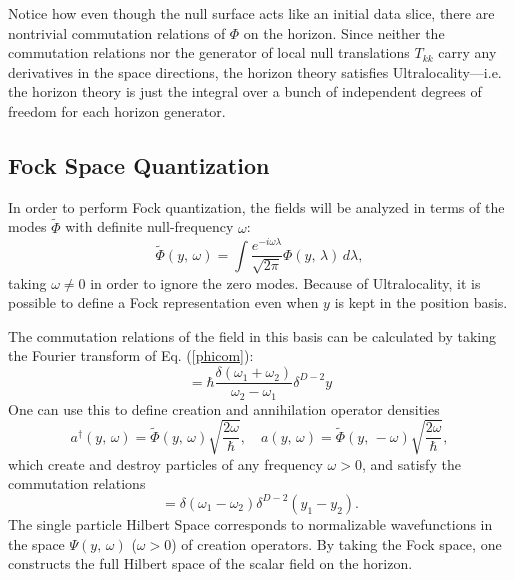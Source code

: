 \documentclass{article}
\begin{document}
Notice how even though the null surface acts like an initial data slice, there are nontrivial commutation relations of $\Phi$ on the horizon.  Since neither the commutation relations nor the generator of local null translations $T_{kk}$ carry any derivatives in the space directions, the horizon theory satisfies Ultralocality---i.e. the horizon theory is just the integral over a bunch of independent degrees of freedom for each horizon generator.

\subsection{Fock Space Quantization}\label{fock}

In order to perform Fock quantization, the fields will be analyzed in terms of the modes $\tilde{\Phi}$ with definite null-frequency $\omega$:
\begin{equation}
\tilde{\Phi}(y,\,\omega) = \int
\frac{e^{-i\omega \lambda}}{\sqrt{2\pi}} \Phi(y,\,\lambda)\,d\lambda,
\end{equation}
taking $\omega \ne 0$ in order to ignore the zero modes.  Because of Ultralocality, it is possible to define a Fock representation even when $y$ is kept in the position basis.

The commutation relations of the field in this basis can be calculated by taking the Fourier transform of Eq. (\ref{phicom}):
\begin{equation}
[\tilde{\Phi}(y_1,\,\omega_1),\,\tilde{\Phi}(y_2,\,\omega_2)] =
\hbar \frac{\delta(\omega_1 + \omega_2)}{\omega_2 - \omega_1} \delta^{D-2}y
\end{equation}
One can use this to define creation and annihilation operator densities
\begin{equation}
a^{\dagger}(y,\,\omega) = \tilde{\Phi}(y,\,\omega) \sqrt{\frac{2\omega}{\hbar}}, \quad
a(y,\,\omega) = \tilde{\Phi}(y,\,-\omega) \sqrt{\frac{2\omega}{\hbar}},
\end{equation}
which create and destroy particles of any frequency $\omega > 0$, and satisfy the commutation relations
\begin{equation}
[a(y_1,\,\omega_1),\,a^\dagger(y_2,\,\omega_2)] =
\delta(\omega_1 - \omega_2) \delta^{D-2}(y_1 - y_2).
\end{equation}
The single particle Hilbert Space corresponds to normalizable wavefunctions in the space $\Psi(y,\,\omega)$ ($\omega > 0$) of creation operators.  By taking the Fock space, one constructs the full Hilbert space of the scalar field on the horizon.
\end{document}
